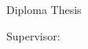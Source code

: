 \begin{titlepage}
    \centering
    {\Huge\bfseries\thesisTitle\par}
    \vspace{1.5cm}
    {\Large Diploma Thesis\par}
    \vspace{1.5cm}
    \vspace{1.5cm}
    {\Large\itshape\thesisFaculty\par}
    \vspace{0.5cm}
    {\Large\itshape\thesisUniversity\par}
    {\Large\bfseries\thesisAuthor\par}
    \vspace{1cm}
    {\large Supervisor: \thesisSupervisor\par}
    \vspace{1.5cm}
    {\large\thesisDate\par}
\end{titlepage}